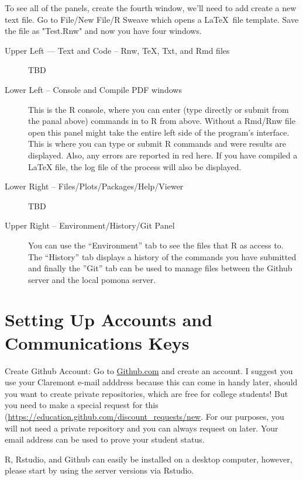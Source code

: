 \documentclass[12pt]{../SOP4_alpha}\usepackage[]{graphicx}\usepackage[]{color}
\begin{document}
\NP To see all of the panels, create the fourth window, we'll need to add create a new text file. Go to File/New File/R Sweave which opens a \LaTeX\ file template. Save the file as "Test.Rnw" and now you have four windows.

\begin{description}
  \item[Upper Left --- Text and Code -- Rnw, \TeX, Txt, and Rmd files] TBD  
  
  \item[Lower Left -- Console and Compile PDF windows] This is the R console, where you can enter (type directly or submit from the panal above) commands in to R from above. Without a Rmd/Rnw file open this panel might take the entire left side of the program's interface. This is where you can type or submit R commands and were results are displayed. Also, any errors are reported in red here. If you have compiled a LaTeX file, the log file of the process will also be displayed.
  
  \item[Lower Right -- Files/Plots/Packages/Help/Viewer] TBD

  \item[Upper Right -- Environment/History/Git Panel] You can use the ``Environment'' tab to see the files that R as access to. The ``History'' tab displays a history of the commands you have submitted and finally the ''Git'' tab can be used to manage files between the Github server and the local pomona server. 
  
\end{description}

\section{Setting Up Accounts and Communications Keys}

\NP Create Github Account: Go to \href{http:\\github.com}{Github.com} and create an account. I suggest you use your Claremont e-mail adddress because this can come in handy later, should you want to create private repositories, which are free for college students! But you need to make a special request for this (\url{https://education.github.com/discount_requests/new}. For our purposes, you will not need a private repository and you can always request on later. Your email address can be used to prove your student status. 
  

\NP R, Rstudio, and Github can easily be installed on a desktop computer, however, please start by using the server versions via Rstudio. 
\end{document}
